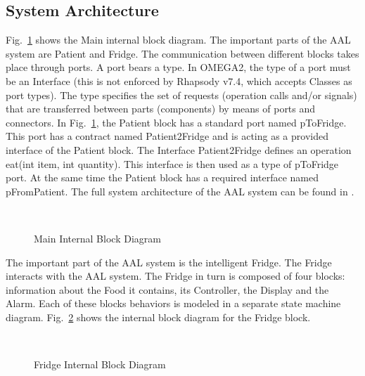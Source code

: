 \documentclass[a4paper,twoside]{article}
\begin{document}
\subsection{System Architecture}
Fig.~\ref{fig:mainibd} shows the Main internal block diagram. The important parts of the AAL system are Patient and Fridge. The communication between different blocks takes place through ports. A  port  bears  a  type.  In  OMEGA2,  the  type  of  a  port  must  be  an  Interface  (this  is  not  enforced  by Rhapsody v7.4, which accepts Classes as port types). The type specifies the set of requests (operation calls and/or signals) that  are transferred between parts (components) by means of ports and connectors. In Fig.~\ref{fig:mainibd}, the Patient block has a standard port named pToFridge. This port has a contract named Patient2Fridge and is acting as a provided interface of the Patient block. The Interface Patient2Fridge defines an operation eat(int item, int quantity). This interface is then used as a type of pToFridge port. At the same time the Patient block has a required interface named pFromPatient. 
The full system architecture of the AAL system can be found in \cite{test13}. 

\begin{figure}[!h]
  \vspace{8cm}~
  \centering
  {}
  \caption{Main Internal Block Diagram}
  \label{fig:mainibd}
 \end{figure}
 

The important part of the AAL system is the intelligent Fridge. The Fridge interacts with the AAL system. The Fridge in turn is composed of four blocks: information about the Food it contains, its Controller, the Display and the Alarm. Each of these blocks behaviors is modeled in a separate state machine diagram. Fig.~\ref{fig:fridgeibd} shows the internal block diagram for the Fridge block.

\begin{figure}[!h]
  \vspace{8cm}~
  \centering
  {}
  \caption{Fridge Internal Block Diagram}
  \label{fig:fridgeibd}
 \end{figure}
 
\end{document}
